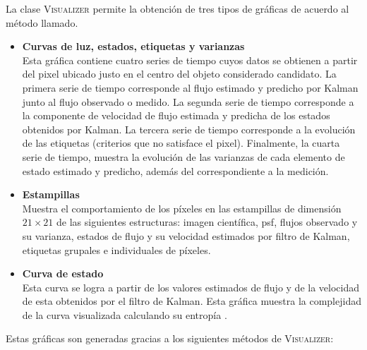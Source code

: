  
La clase \textsc{Visualizer} permite la obtenci\'on de tres tipos de gr\'aficas de acuerdo al m\'etodo llamado.
 
\begin{itemize}
\item \textbf{Curvas de luz, estados, etiquetas y varianzas}\\
Esta gr\'afica contiene cuatro series de tiempo cuyos datos se obtienen a partir del pixel ubicado justo en el centro del objeto considerado candidato. La primera serie de tiempo corresponde al flujo estimado y predicho por Kalman junto al flujo observado o medido. La segunda serie de tiempo corresponde a la componente de velocidad de flujo estimada y predicha de los estados obtenidos por Kalman. La tercera serie de tiempo corresponde a la evoluci\'on de las etiquetas (criterios que no satisface el pixel). Finalmente, la cuarta serie de tiempo, muestra la evolución de las varianzas de cada elemento de estado estimado y predicho, además del correspondiente a la medición.
  
\item \textbf{Estampillas}\\ 
Muestra el comportamiento de los p\'ixeles en las estampillas de dimensi\'on $21 \times 21$ de las siguientes estructuras: imagen cient\'ifica, \gls{psf}, flujos observado y su varianza, estados de flujo y su velocidad estimados por filtro de Kalman, etiquetas grupales e individuales de p\'ixeles.
\item \textbf{Curva de estado}\\
 Esta curva se logra a partir de los valores estimados de flujo y de la velocidad de esta obtenidos por el filtro de Kalman. Esta gr\'afica muestra la complejidad de la curva visualizada calculando su entrop\'ia \cite{balestrino}.
\end{itemize}

Estas gr\'aficas son generadas gracias a los siguientes m\'etodos de \textsc{Visualizer}:


